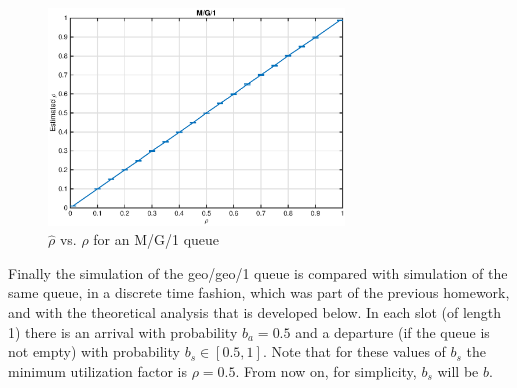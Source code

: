 \documentclass[10pt]{article}
\begin{document}
\begin{figure}[h!]
	\centering
	\includegraphics[width = 0.7\textwidth]{mg1_rho}
	\caption{$\hat{\rho}$ vs. $\rho$ for an M/G/1 queue}
	\label{fig:mg1_rho}
\end{figure}

Finally the simulation of the geo/geo/1 queue is compared with simulation of the same queue, in a discrete time fashion, which was part of the previous homework, and with the theoretical analysis that is developed below. In each slot (of length 1) there is an arrival with probability $b_a = 0.5$ and a departure (if the queue is not empty) with probability $b_s \in [0.5, 1]$. Note that for these values of $b_s$ the minimum utilization factor is $\rho = 0.5$. 
From now on, for simplicity, $b_s$ will be $b$.
\end{document}
